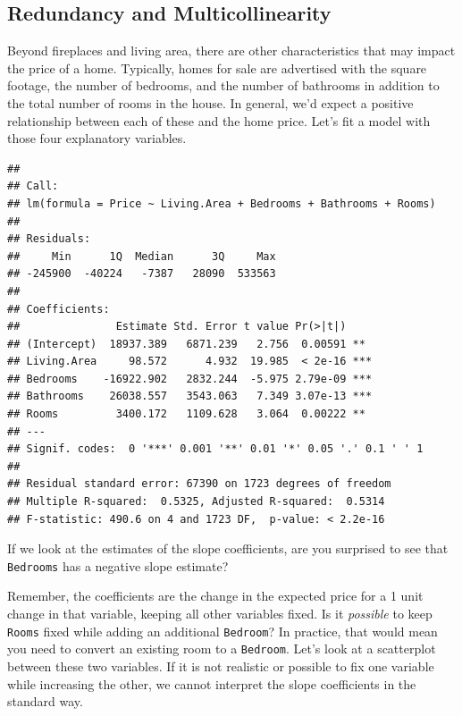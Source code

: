 \documentclass[
]{book}
\newenvironment{Shaded}{\begin{snugshade}}{\end{snugshade}}
\newcommand{\KeywordTok}[1]{\textcolor[rgb]{0.13,0.29,0.53}{\textbf{#1}}}
\newcommand{\NormalTok}[1]{#1}
\newcommand{\OperatorTok}[1]{\textcolor[rgb]{0.81,0.36,0.00}{\textbf{#1}}}
\newcommand{\StringTok}[1]{\textcolor[rgb]{0.31,0.60,0.02}{#1}}
\begin{document}
\hypertarget{redundant}{%
\subsection{Redundancy and Multicollinearity}\label{redundant}}

Beyond fireplaces and living area, there are other characteristics that may impact the price of a home. Typically, homes for sale are advertised with the square footage, the number of bedrooms, and the number of bathrooms in addition to the total number of rooms in the house. In general, we'd expect a positive relationship between each of these and the home price. Let's fit a model with those four explanatory variables.

\begin{Shaded}
\end{Shaded}

\begin{verbatim}
## 
## Call:
## lm(formula = Price ~ Living.Area + Bedrooms + Bathrooms + Rooms)
## 
## Residuals:
##     Min      1Q  Median      3Q     Max 
## -245900  -40224   -7387   28090  533563 
## 
## Coefficients:
##               Estimate Std. Error t value Pr(>|t|)    
## (Intercept)  18937.389   6871.239   2.756  0.00591 ** 
## Living.Area     98.572      4.932  19.985  < 2e-16 ***
## Bedrooms    -16922.902   2832.244  -5.975 2.79e-09 ***
## Bathrooms    26038.557   3543.063   7.349 3.07e-13 ***
## Rooms         3400.172   1109.628   3.064  0.00222 ** 
## ---
## Signif. codes:  0 '***' 0.001 '**' 0.01 '*' 0.05 '.' 0.1 ' ' 1
## 
## Residual standard error: 67390 on 1723 degrees of freedom
## Multiple R-squared:  0.5325,	Adjusted R-squared:  0.5314 
## F-statistic: 490.6 on 4 and 1723 DF,  p-value: < 2.2e-16
\end{verbatim}

If we look at the estimates of the slope coefficients, are you surprised to see that \texttt{Bedrooms} has a negative slope estimate?

Remember, the coefficients are the change in the expected price for a 1 unit change in that variable, keeping all other variables fixed. Is it \emph{possible} to keep \texttt{Rooms} fixed while adding an additional \texttt{Bedroom}? In practice, that would mean you need to convert an existing room to a \texttt{Bedroom}. Let's look at a scatterplot between these two variables. If it is not realistic or possible to fix one variable while increasing the other, we cannot interpret the slope coefficients in the standard way.
\end{document}
